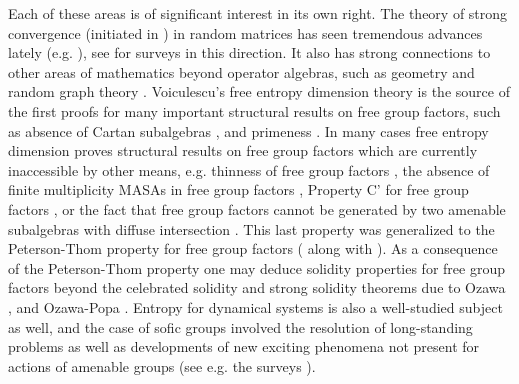 \documentclass[10pt]{amsart}
\theoremstyle{definition}
\numberwithin{equation}{section}
\begin{document}
Each of these areas is of significant interest in its own right. The theory of strong convergence (initiated in \cite{HaagThorbNormBound}) in random matrices has seen tremendous advances lately (e.g. \cite{PTkilled,CollinsBordenave,  bordenave2023norm, Chen_2026, chen2024newapproachstrongconvergence, gao2026newsource, loudermagee2025limitgroups,   MdLSstrongasymptoticfreenesshaar, MageeThomas2023, Parraud2024strong}), see \cite{ magee2025strong, vHICM, vHCDM} for surveys in this direction. It also has strong connections to other areas of mathematics beyond operator algebras, such as geometry \cite{MageeHide, magee2025strongconvergenceuniformlyrandom, MageeThomas2023, song2025randomharmonicmapsspheres} and random graph theory \cite{CollinsBordenave, bordenave2023norm}. Voiculescu's free entropy dimension theory is the source of the first proofs for many important structural results on free group factors, such as absence of Cartan subalgebras \cite{Voiculescu1996}, and primeness \cite{GePrime}. In many cases free entropy dimension proves structural results on free group factors which are currently inaccessible by other means, e.g. thinness of free group factors \cite{GeNonPrimeSG}, the absence of finite multiplicity MASAs in free group factors \cite{DykemaFreeEntropy}, Property C' for free group factors \cite{Hayes2018}, or the fact that free group factors cannot be generated by two amenable subalgebras with diffuse intersection \cite{Jung2007}. This last property was generalized to
the Peterson-Thom property for free group factors (\cite{HayesPT} along with \cite{PTkilled, bordenave2023norm, chen2024newapproachstrongconvergence, magee2025strong, Parraud2024strong}). As a consequence of the Peterson-Thom property one may deduce solidity properties for free group factors \cite{hayes2024generalsolidityphenomenaanticoarse} beyond the celebrated solidity and strong solidity theorems due to Ozawa \cite{OzawaSolidActa}, and Ozawa-Popa \cite{OzPopaCartan}.
Entropy for dynamical systems is also a well-studied subject as well, and the case of sofic groups involved the resolution of long-standing problems as well as developments of new exciting phenomena not present for actions of amenable groups (see e.g. the surveys \cite{LewisICM, BowenExamples}).
\end{document}
